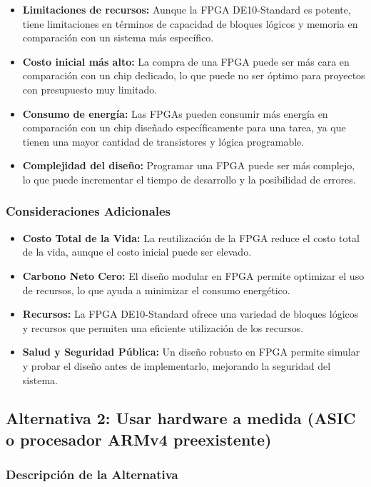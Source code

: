 \documentclass[conference]{IEEEtran}
\begin{document}
\begin{itemize}
	\item \textbf{Limitaciones de recursos:} Aunque la FPGA DE10-Standard es potente, tiene limitaciones en términos de capacidad de bloques lógicos y memoria en comparación con un sistema más específico.
	\item \textbf{Costo inicial más alto:} La compra de una FPGA puede ser más cara en comparación con un chip dedicado, lo que puede no ser óptimo para proyectos con presupuesto muy limitado.
	\item \textbf{Consumo de energía:} Las FPGAs pueden consumir más energía en comparación con un chip diseñado específicamente para una tarea, ya que tienen una mayor cantidad de transistores y lógica programable.
	\item \textbf{Complejidad del diseño:} Programar una FPGA puede ser más complejo, lo que puede incrementar el tiempo de desarrollo y la posibilidad de errores.
\end{itemize}

\subsubsection*{Consideraciones Adicionales}

\begin{itemize}
	\item \textbf{Costo Total de la Vida:} La reutilización de la FPGA reduce el costo total de la vida, aunque el costo inicial puede ser elevado.
	\item \textbf{Carbono Neto Cero:} El diseño modular en FPGA permite optimizar el uso de recursos, lo que ayuda a minimizar el consumo energético.
	\item \textbf{Recursos:} La FPGA DE10-Standard ofrece una variedad de bloques lógicos y recursos que permiten una eficiente utilización de los recursos.
	\item \textbf{Salud y Seguridad Pública:} Un diseño robusto en FPGA permite simular y probar el diseño antes de implementarlo, mejorando la seguridad del sistema.
\end{itemize}

\subsection{Alternativa 2: Usar hardware a medida (ASIC o procesador ARMv4 preexistente)}

\subsubsection*{Descripción de la Alternativa}
\end{document}

